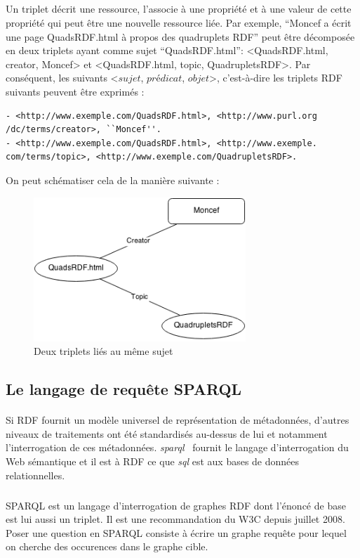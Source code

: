 \subparagraph{}
Un triplet décrit une ressource, l’associe à une propriété et à une valeur de cette propriété qui peut être une nouvelle ressource liée. 
\newline
Par exemple, ``Moncef a écrit une page QuadsRDF.html à propos des quadruplets RDF” peut être décomposée en deux triplets ayant comme sujet ``QuadsRDF.html”: <QuadsRDF.html, creator, Moncef> et <QuadsRDF.html, topic, QuadrupletsRDF>.
\newline
Par conséquent, les suivants <$sujet$, $prédicat$, $objet$>, c'est-à-dire les triplets RDF suivants peuvent être exprimés :
\begin{verbatim}
- <http://www.exemple.com/QuadsRDF.html>, <http://www.purl.org
/dc/terms/creator>, ``Moncef''.
- <http://www.exemple.com/QuadsRDF.html>, <http://www.exemple.
com/terms/topic>, <http://www.exemple.com/QuadrupletsRDF>.
\end{verbatim}
On peut schématiser cela de la manière suivante :
\begin{figure}[H]
\centering
\centering
\includegraphics[width=8cm]{Diagram.png}
\caption{Deux triplets liés au même sujet}
\end{figure}
\subsection{Le langage de requête SPARQL}
\paragraph{}
Si RDF fournit un modèle universel de représentation de métadonnées, d'autres niveaux de traitements ont été standardisés au-dessus de lui et notamment l'interrogation de ces métadonnées. 
{\itshape \gls{sparql}}~\cite{SPARQL_W3C:13} fournit le langage d'interrogation du Web sémantique et il est à RDF ce que {\itshape \gls{sql}} est aux bases de données relationnelles.
\subparagraph{}
SPARQL est un langage d'interrogation de graphes RDF dont l'énoncé de base est lui aussi un triplet. Il est une recommandation du W3C depuis juillet 2008.
Poser une question en SPARQL consiste à écrire un graphe requête pour lequel on cherche des occurences dans le graphe cible.
